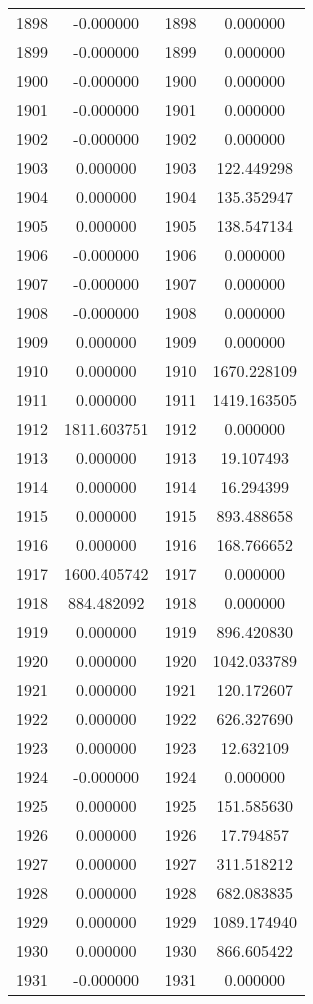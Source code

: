 \documentclass[12pt]{article}
\begin{document}
\begin{longtable}{@{}cccc@{}}
1898 & -0.000000 & 1898 & 0.000000 \\
1899 & -0.000000 & 1899 & 0.000000 \\
1900 & -0.000000 & 1900 & 0.000000 \\
1901 & -0.000000 & 1901 & 0.000000 \\
1902 & -0.000000 & 1902 & 0.000000 \\
1903 & 0.000000 & 1903 & 122.449298 \\
1904 & 0.000000 & 1904 & 135.352947 \\
1905 & 0.000000 & 1905 & 138.547134 \\
1906 & -0.000000 & 1906 & 0.000000 \\
1907 & -0.000000 & 1907 & 0.000000 \\
1908 & -0.000000 & 1908 & 0.000000 \\
1909 & 0.000000 & 1909 & 0.000000 \\
1910 & 0.000000 & 1910 & 1670.228109 \\
1911 & 0.000000 & 1911 & 1419.163505 \\
1912 & 1811.603751 & 1912 & 0.000000 \\
1913 & 0.000000 & 1913 & 19.107493 \\
1914 & 0.000000 & 1914 & 16.294399 \\
1915 & 0.000000 & 1915 & 893.488658 \\
1916 & 0.000000 & 1916 & 168.766652 \\
1917 & 1600.405742 & 1917 & 0.000000 \\
1918 & 884.482092 & 1918 & 0.000000 \\
1919 & 0.000000 & 1919 & 896.420830 \\
1920 & 0.000000 & 1920 & 1042.033789 \\
1921 & 0.000000 & 1921 & 120.172607 \\
1922 & 0.000000 & 1922 & 626.327690 \\
1923 & 0.000000 & 1923 & 12.632109 \\
1924 & -0.000000 & 1924 & 0.000000 \\
1925 & 0.000000 & 1925 & 151.585630 \\
1926 & 0.000000 & 1926 & 17.794857 \\
1927 & 0.000000 & 1927 & 311.518212 \\
1928 & 0.000000 & 1928 & 682.083835 \\
1929 & 0.000000 & 1929 & 1089.174940 \\
1930 & 0.000000 & 1930 & 866.605422 \\
1931 & -0.000000 & 1931 & 0.000000 \\

\end{longtable}
\end{document}
